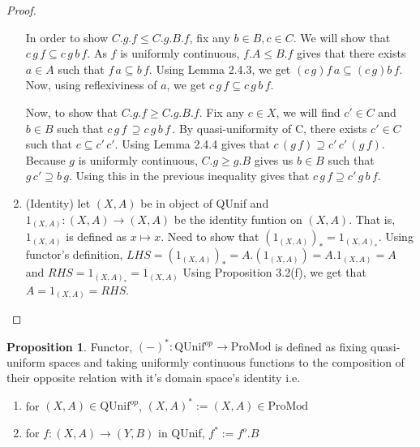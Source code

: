 \documentclass[18pt,a4paper]{article}
\theoremstyle{definition}
\newtheorem{proop}[theorem]{Proposition}
\begin{document}
\begin{proof}
\begin{enumerate}[label=(\roman*)]
	In order to show $C.g.f \leq C.g.B.f$, fix any $b\in B, c\in C$.
			We will show that $c\,g\,f \subseteq c\,g\,b\,f$. As $f$ is uniformly
			continuous, $f.A \leq B.f$ gives that there exists $a \in A$ such that
			$f\,a \subseteq b\,f$. Using Lemma 2.4.3, we get $(c\,g)f\,a \subseteq
			(c\,g)b\,f$. Now, using reflexiviness of $a$, we get $c\,g\,f \subseteq
			c\,g\,b\,f$.

			Now, to show that $C.g.f \geq C.g.B.f$. Fix any $c \in X$, we will find $c' \in C$ and
			$b \in B$ such that $c\, g\, f\, \supseteq c\, g\, b\, f\, $. By quasi-uniformity of C,
			there exists $c' \in C$ such that $c \subseteq  c'\, c'$. Using Lemma 2.4.4
			gives that $c\, (g\, f)\supseteq c'\, c'\, (g\, f) $. Because $g$ is uniformly
			continuous, $C.g \geq g.B$ gives us $b\in B$ such that $g\, c' \supseteq b\, g$.
			Using this in the previous inequality gives that $c\, g\, f \supseteq c'\, g\, b\, f$.

			\item(Identity) let $(X,A)$ be in object of QUnif and
				$1_{(X,A)}:(X,A)\to(X,A)$ be the identity funtion on $(X,A)$. That is,
				$1_{(X,A)}$ is defined as $x\mapsto x$.
				Need to show that $(1_{(X,A)})_*=1_{(X,A)_*}$. Using
				functor's definition, $LHS=(1_{(X,A)})_*=A.(1_{(X,A)})=A.1_{(X,A)}=A$
				and $RHS=1_{(X,A)_*}=1_{(X,A)}$
				Using Proposition 3.2(f), we get that $A=1_{(X,A)}=RHS$.
		\end{enumerate}
\end{proof}
\begin{proop} Functor, $(-)^*:\text{QUnif}^{op} \to \text{ProMod}$ is
	defined as fixing quasi-uniform spaces and taking
	uniformly continuous functions to the composition of their opposite
	relation with it's domain space's identity i.e.
	\begin{enumerate}[label=(\alph*)]
		\item for $(X,A) \in \text{QUnif}^{op}$, $(X,A)^*:=(X,A) \in \text{ProMod}$
		\item for $f:(X,A) \to (Y,B)$ in QUnif,
			$f^* := f^o .B$
	\end{enumerate}
\end{proop}
\end{document}

